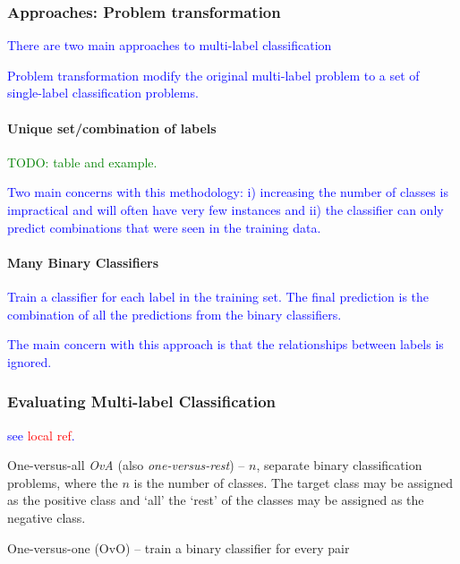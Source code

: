 \subsubsection{Approaches: Problem transformation}

\textcolor{blue}{There are two main approaches to multi-label classification}

\textcolor{blue}{{Problem transformation} modify the original multi-label problem to a set of single-label classification problems.}

\paragraph{Unique set/combination of labels}

\textcolor{green}{TODO: table and example.}

\textcolor{blue}{Two main concerns with this methodology: i) increasing the number of classes is impractical and will often have very few instances and ii) the classifier can only predict combinations that were seen in the training data.}

\paragraph{Many Binary Classifiers}

\textcolor{blue}{Train a classifier for each label in the training set. The final prediction is the combination of all the predictions from the binary classifiers.}

\textcolor{blue}{The main concern with this approach is that the relationships between labels is ignored.}

\subsubsection{Evaluating Multi-label Classification}

\textcolor{blue}{see \textcolor{red}{local ref}.}

One-versus-all \emph{OvA} (also \emph{one-versus-rest}) -- $n$, separate binary classification problems, where the $n$ is the number of classes. The target class may be assigned as the positive class and `all' the `rest' of the classes may be assigned as the negative class.

One-versus-one (OvO) -- train a binary classifier for every pair


